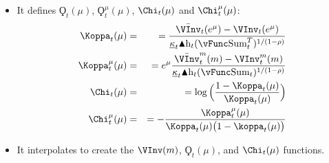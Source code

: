 \documentclass[titlepage,abstract]{\econtex}
\providecommand{\vSum}{\vFunc\text{Sum}}
\providecommand{\Deltah}{\blacktriangle \mathrm{h}}
\begin{document}
\begin{itemize}
        \item It defines $\ensuremath{\Koppa}_{t}(\mu)$, $\ensuremath{\Koppa}_{t}^{\mu}(\mu)$, $\Chi_{t}(\mu)$ and $\Chi_{t}^{\mu}(\mu)$:
            \begin{equation}\begin{gathered}\begin{aligned}
            \Koppa_{t} (\mu)  &=& =  \frac{\bar{\VInv}_{t} (e^{\mu}) -\VInv_{t} (e^{\mu})}{\underline{\kappa}_{t} \Deltah_{t} (\vSum_{t}^{T})^{1/(1-\rho)}} \\
            \Koppa_{t}^{\mu} (\mu)  &=& =  e^{\mu} \frac{\bar{\VInv}_{t}^{m} (m)- \VInv_{t}^{m} (m)}{\underline{\kappa}_{t} \Deltah_{t} (\vSum_{t})^{1/(1-\rho)}} \\
            \Chi_{t} (\mu)  &=& =  \log\Big(\frac{1-\Koppa_{t} (\mu)}{\Koppa_{t} (\mu) }\Big) \\
            \Chi_{t}^{\mu} (\mu)  &=& =  -\frac{\Koppa_{t}^{\mu}(\mu)}{\Koppa_{t} (\mu)\big(1-\koppa_{t} (\mu)\big)}
            \end{aligned}\end{gathered}\end{equation}
        \item It interpolates to create the $\VInv(m)$, $\ensuremath{\Koppa}_{t}(\mu)$, and $\Chi_{t}(\mu)$ functions.
        \end{itemize}
\end{document}

